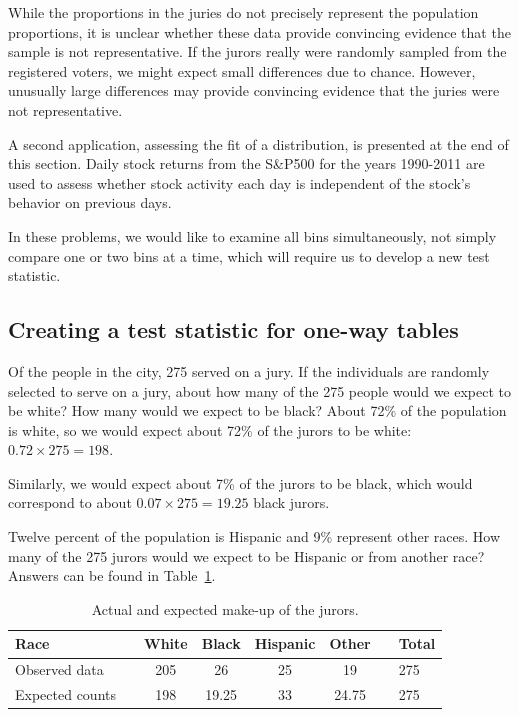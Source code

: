 While the proportions in the juries do not precisely represent the population proportions, it is unclear whether these data provide convincing evidence that the sample is not representative. If the jurors really were randomly sampled from the registered voters, we might expect small differences due to chance. However, unusually large differences may provide convincing evidence that the juries were not representative.

A second application, assessing the fit of a distribution, is presented at the end of this section. Daily stock returns from the S\&P500 for the years 1990-2011 are used to assess whether stock activity each day is independent of the stock's behavior on previous days.

In these problems, we would like to examine all bins simultaneously, not simply compare one or two bins at a time, which will require us to develop a new test statistic.


\subsection{Creating a test statistic for one-way tables}

\begin{example}{Of the people in the city, 275 served on a jury. If the individuals are randomly selected to serve on a jury, about how many of the 275 people would we expect to be white? How many would we expect to be black?}
About 72\% of the population is white, so we would expect about 72\% of the jurors to be white: $0.72\times 275 = 198$.

Similarly, we would expect about 7\% of the jurors to be black, which would correspond to about $0.07\times 275 = 19.25$ black jurors.
\end{example}

\begin{exercise}
Twelve percent of the population is Hispanic and 9\% represent other races. How many of the 275 jurors would we expect to be Hispanic or from another race? Answers can be found in Table~\ref{expectedJuryRepresentationIfNoBias}.
\end{exercise}

\begin{table}[h]
\centering
\begin{tabular}{ll ccc c ll}
\hline
Race	 & \hspace{2mm} & White & Black & Hispanic & Other & \hspace{2mm} & Total \\
\hline
Observed data			&	& 205 & 26	& 25 & 19	&	& 275 \\
Expected counts	 &	& 198 & 19.25 & 33 & 24.75 & & 275 \\
\hline
\end{tabular}
\caption{Actual and expected make-up of the jurors.}
\label{expectedJuryRepresentationIfNoBias}
\end{table}

